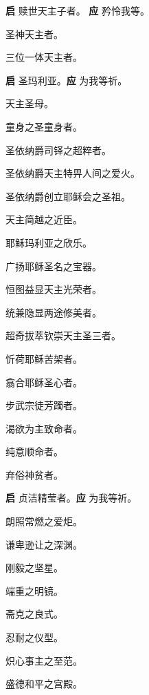 \documentclass[UTF8,17pt]{ctexart}
\begin{document}
\textbf{启} \quad 赎世天主⼦者。 \hfill \textbf{应} \quad 矜怜我等。

 圣神天主者。

 三位⼀体天主者。

\textbf{启} \quad 圣玛利亚。\hfill \textbf{应} \quad 为我等祈。

 天主圣母。

 童⾝之圣童⾝者。

 圣依纳爵司铎之超粹者。

 圣依纳爵天主特畀人间之爱火。

 圣依纳爵创⽴耶稣会之圣祖。

 天主简越之近⾂。

 耶稣玛利亚之欣乐。

 ⼴扬耶稣圣名之宝器。

 恒图益显天主光荣者。

 统兼隐显两途修美者。

 超奇拔萃钦崇天主圣三者。

 忻荷耶稣苦架者。

 翕合耶稣圣⼼者。

 步武宗徒芳躅者。

 渴欲为主致命者。

 纯意顺命者。

 弃俗神贫者。

\textbf{启} \quad 贞洁精莹者。\hfill \textbf{应} \quad 为我等祈。

 朗照常燃之爱炬。

 谦卑逊让之深渊。

 刚毅之坚星。

 端重之明镜。

 斋克之良式。

 忍耐之仪型。

 炽⼼事主之⾄范。

 盛德和平之宫殿。
\end{document}

